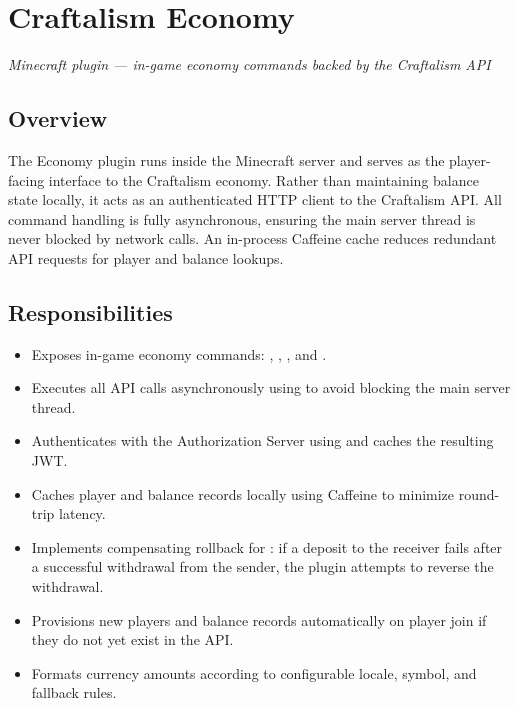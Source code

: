 

\chapter{Craftalism Economy}
\label{ch:economy}


\textcolor{CraftGray}{\textit{Minecraft plugin — in-game economy commands backed by the Craftalism API}}

\bigskip

\section{Overview}

The Economy plugin runs inside the Minecraft server and serves as the player-facing interface to the Craftalism economy. Rather than maintaining balance state locally, it acts as an authenticated HTTP client to the Craftalism API. All command handling is fully asynchronous, ensuring the main server thread is never blocked by network calls. An in-process Caffeine cache reduces redundant API requests for player and balance lookups.

\section{Responsibilities}

\begin{itemize}
  \item Exposes in-game economy commands: , , , and .
  \item Executes all API calls asynchronously using  to avoid blocking the main server thread.
  \item Authenticates with the Authorization Server using  and caches the resulting JWT.
  \item Caches player and balance records locally using Caffeine to minimize round-trip latency.
  \item Implements compensating rollback for : if a deposit to the receiver fails after a successful withdrawal from the sender, the plugin attempts to reverse the withdrawal.
  \item Provisions new players and balance records automatically on player join if they do not yet exist in the API.
  \item Formats currency amounts according to configurable locale, symbol, and fallback rules.
\end{itemize}

